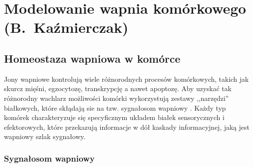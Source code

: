 \chapter[Modelowanie wapnia komórkowego]{Modelowanie wapnia komórkowego\\{\large (B.~Kaźmierczak)}}

\section{Homeostaza wapniowa w komórce}

Jony wapniowe kontrolują wiele różnorodnych procesów komórkowych, takich jak skurcz mięśni, egzocytozę, transkrypcję a nawet apoptozę. Aby uzyskać tak różnorodny wachlarz możliwości komórki wykorzystują zestawy ,,narzędzi'' białkowych, które skłądają sie na tzw. sygnałosom wapniowy \cite{Berridge2012}. Każdy typ komórek charakteryzuje się specyficznym układem białek sensorycznych i efektorowych, które przekazują informacje w dół kaskady informacyjnej, jaką jest wapniowy szlak sygnałowy.



\subsection{Sygnałosom wapniowy}



